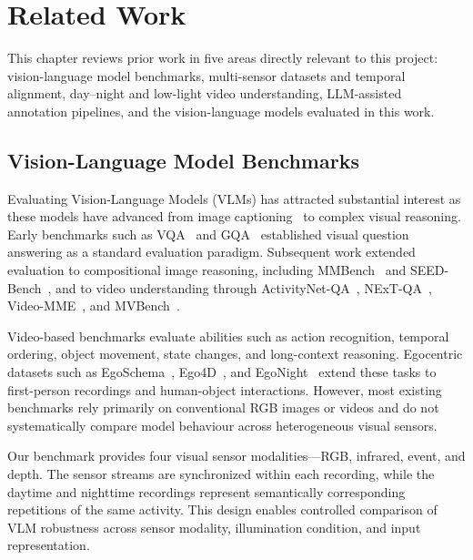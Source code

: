 
\chapter{Related Work}
\label{ch:related_work}

This chapter reviews prior work in five areas directly relevant to this
project: vision-language model benchmarks, multi-sensor datasets and temporal
alignment, day--night and low-light video understanding, LLM-assisted annotation
pipelines, and the vision-language models evaluated in this work.


\section{Vision-Language Model Benchmarks}
\label{sec:rw_vlm_benchmarks}

Evaluating Vision-Language Models (VLMs) has attracted substantial interest as
these models have advanced from image captioning~\cite{chen2015microsoft} to
complex visual reasoning. Early benchmarks such as VQA~\cite{antol2015vqa} and
GQA~\cite{hudson2019gqa} established visual question answering as a standard
evaluation paradigm. Subsequent work extended evaluation to compositional image
reasoning, including MMBench~\cite{liu2023mmbench} and
SEED-Bench~\cite{li2023seedbench}, and to video understanding through
ActivityNet-QA~\cite{yu2019activitynet}, NExT-QA~\cite{xiao2021nextqa},
Video-MME~\cite{fu2024videomme}, and MVBench~\cite{li2024mvbench}.

Video-based benchmarks evaluate abilities such as action recognition, temporal
ordering, object movement, state changes, and long-context reasoning. Egocentric
datasets such as EgoSchema~\cite{mangalam2023egoschema},
Ego4D~\cite{grauman2022ego4d}, and EgoNight~\cite{egonight2024} extend these
tasks to first-person recordings and human-object interactions. However, most
existing benchmarks rely primarily on conventional RGB images or videos and do
not systematically compare model behaviour across heterogeneous visual sensors.

Our benchmark provides four visual sensor modalities---RGB, infrared, event,
and depth. The sensor streams are
synchronized within each recording, while the daytime and nighttime recordings
represent semantically corresponding repetitions of the same activity. This
design enables controlled comparison of VLM robustness across sensor modality,
illumination condition, and input representation.


